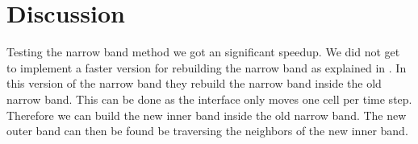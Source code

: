 




\section{Discussion}

Testing the narrow band method we got an significant speedup. We did
not get to implement a faster version for rebuilding the narrow band
as explained in . In this version of the narrow
band they rebuild the narrow band inside the old narrow band. This can
be done as the interface only moves one cell per time step. Therefore
we can build the new inner band inside the old narrow band. The new
outer band can then be found be traversing the neighbors of the new
inner band. 




